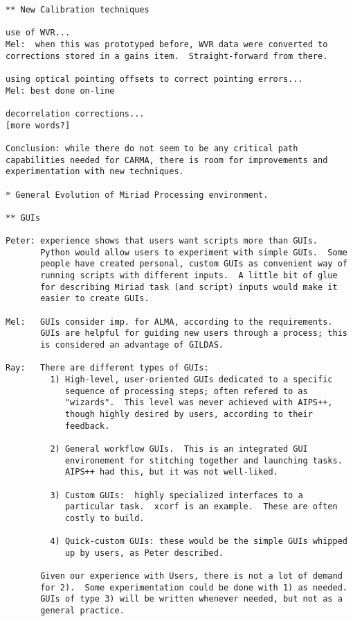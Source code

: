 \begin{verbatim}
** New Calibration techniques

use of WVR...
Mel:  when this was prototyped before, WVR data were converted to
corrections stored in a gains item.  Straight-forward from there.  

using optical pointing offsets to correct pointing errors...
Mel: best done on-line

decorrelation corrections...
[more words?]

Conclusion: while there do not seem to be any critical path
capabilities needed for CARMA, there is room for improvements and
experimentation with new techniques.  

* General Evolution of Miriad Processing environment.

** GUIs

Peter: experience shows that users want scripts more than GUIs.
       Python would allow users to experiment with simple GUIs.  Some
       people have created personal, custom GUIs as convenient way of
       running scripts with different inputs.  A little bit of glue
       for describing Miriad task (and script) inputs would make it
       easier to create GUIs.

Mel:   GUIs consider imp. for ALMA, according to the requirements.
       GUIs are helpful for guiding new users through a process; this 
       is considered an advantage of GILDAS.  

Ray:   There are different types of GUIs:
         1) High-level, user-oriented GUIs dedicated to a specific
            sequence of processing steps; often refered to as
            "wizards".  This level was never achieved with AIPS++, 
            though highly desired by users, according to their
            feedback. 

         2) General workflow GUIs.  This is an integrated GUI
            environement for stitching together and launching tasks.
            AIPS++ had this, but it was not well-liked.

         3) Custom GUIs:  highly specialized interfaces to a
            particular task.  xcorf is an example.  These are often
            costly to build.

         4) Quick-custom GUIs: these would be the simple GUIs whipped
            up by users, as Peter described.

       Given our experience with Users, there is not a lot of demand
       for 2).  Some experimentation could be done with 1) as needed.
       GUIs of type 3) will be written whenever needed, but not as a
       general practice.  


\end{verbatim}
